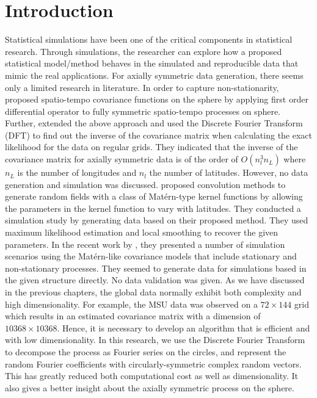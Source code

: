 %
%
%



\section{Introduction}

Statistical simulations have been one of the critical components in statistical research. Through simulations, the researcher can explore how a proposed statistical model/method behaves in the simulated and reproducible data that mimic the real applications. For axially symmetric data generation, there seems only a limited research in literature. In order to capture non-stationarity, \cite{JunStein2007} proposed spatio-tempo covariance functions on the sphere by applying first order differential operator to fully symmetric spatio-tempo processes on sphere. Further, \cite{JunStein2008} extended the above approach and used the Discrete Fourier Transform (DFT) to find out the inverse of the covariance matrix when calculating the exact likelihood for the data on regular grids. They indicated that the inverse of the covariance matrix for axially symmetric data is of the order of $O(n_l^3 n_L)$ where $n_L$ is the number of longitudes and $n_l$ the number of latitudes. However, no data generation and simulation was discussed. \cite{Li2013} proposed convolution methods to generate random fields with a class of Mat\'{e}rn-type kernel functions by allowing the parameters in the kernel function to vary with latitudes. They conducted a simulation study by generating data based on their proposed method. They used maximum likelihood estimation and local smoothing to recover the given parameters. In the recent work by \cite{JeongJun2015}, they presented a number of simulation scenarios using the Mat\'{e}rn-like covariance models that include stationary and non-stationary processes. They seemed to generate data for simulations based in the given \cov structure directly. No data validation was given. As we have discussed in the previous chapters, the global data normally exhibit both complexity and high dimensionality. For example, the MSU data was observed on a $72 \times 144$ grid which results in an estimated covariance matrix with a dimension of $10368\times 10368$. Hence, it is necessary to develop an algorithm that is efficient and with low dimensionality. In this research, we use the Discrete Fourier Transform to decompose the process as Fourier series on the circles, and represent the random Fourier coefficients with circularly-symmetric complex random vectors. This has greatly reduced both computational cost as well as dimensionality. It also gives a better insight about the axially symmetric process on the sphere.\\

